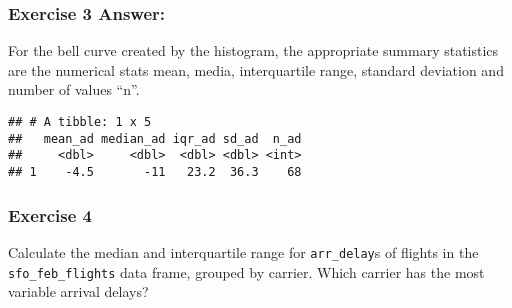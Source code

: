 \documentclass[
]{article}
\newenvironment{Shaded}{\begin{snugshade}}{\end{snugshade}}
\newcommand{\DataTypeTok}[1]{\textcolor[rgb]{0.13,0.29,0.53}{#1}}
\newcommand{\KeywordTok}[1]{\textcolor[rgb]{0.13,0.29,0.53}{\textbf{#1}}}
\newcommand{\NormalTok}[1]{#1}
\newcommand{\OperatorTok}[1]{\textcolor[rgb]{0.81,0.36,0.00}{\textbf{#1}}}
\newcommand{\StringTok}[1]{\textcolor[rgb]{0.31,0.60,0.02}{#1}}
\begin{document}
\hypertarget{exercise-3-answer}{%
\subsubsection{\texorpdfstring{\textbf{Exercise 3
Answer:}}{Exercise 3 Answer:}}\label{exercise-3-answer}}

For the bell curve created by the histogram, the appropriate summary
statistics are the numerical stats mean, media, interquartile range,
standard deviation and number of values ``n''.

\begin{Shaded}
\end{Shaded}

\begin{verbatim}
## # A tibble: 1 x 5
##   mean_ad median_ad iqr_ad sd_ad  n_ad
##     <dbl>     <dbl>  <dbl> <dbl> <int>
## 1    -4.5       -11   23.2  36.3    68
\end{verbatim}

\hypertarget{exercise-4}{%
\subsubsection{Exercise 4}\label{exercise-4}}

Calculate the median and interquartile range for \texttt{arr\_delay}s of
flights in the \texttt{sfo\_feb\_flights} data frame, grouped by
carrier. Which carrier has the most variable arrival delays?

\begin{Shaded}
\end{Shaded}
\end{document}
